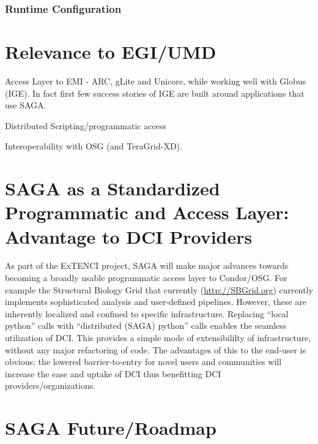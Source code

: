 \documentclass[12pt]{article}
\begin{document}
 \subsubsection*{Runtime Configuration}

   


\section{Relevance to EGI/UMD}

Access Layer to EMI - ARC, gLite and Unicore, while working well with
Globus (IGE). In fact first few success stories of IGE are built
around applications that use SAGA.

Distributed Scripting/programmatic access

Interoperability with OSG (and TeraGrid-XD).

\section{SAGA as a Standardized Programmatic and Access Layer:
  Advantage to DCI Providers}

As part of the ExTENCI project, SAGA will make major advances towards
becoming a broadly usable programmatic access layer to Condor/OSG.
For example the Structural Biology Grid that currently
(\url{http://SBGrid.org}) currently implements sophisticated analysis
and user-defined pipelines. However, these are inherently localized
and confined to specific infrastructure.  Replacing ``local python''
calls with ``distributed (SAGA) python'' calls enables the seamless
utilization of DCI. This provides a simple mode of extensibililty of
infrastructure, without any major refactoring of code. The advantages
of this to the end-user is obvious; the lowered barrier-to-entry for
novel users and communities will increase the ease and uptake of DCI
thus benefitting DCI providers/organizations.

\section{SAGA Future/Roadmap}



\end{document}
